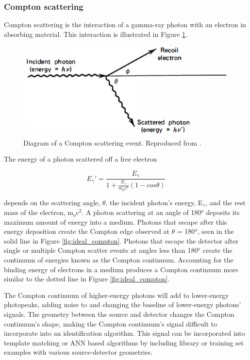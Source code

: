 \subsubsection{Compton scattering}

Compton scattering is the interaction of a gamma-ray photon with an electron in absorbing material. This interaction is illustrated in Figure \ref{fig:compton_scatter}.



\begin{figure}[H]
\centering
\includegraphics[width=0.7\linewidth]{images/compton_scatter}
\caption{Diagram of a Compton scattering event. Reproduced from \cite{knoll}.}
\label{fig:compton_scatter}
\end{figure}

The energy of a photon scattered off a free electron

\begin{equation} \label{eq:compton_scatter}
E_{\gamma}' = \frac{E_{\gamma}}{1 + \frac{E_{\gamma}}{m_{0} c^2} (1-cos\theta)}
\end{equation}

depends on the scattering angle, $\theta$, the incident photon's energy, E$_{\gamma}$, and the rest mass of the electron, m$_{o}$c$^{2}$. A photon scattering at an angle of 180$^{o}$ deposits its maximum amount of energy into a medium. Photons that escape after this energy deposition create the Compton edge observed at $\theta$ = 180$^{o}$, seen in the solid line in Figure \ref{fig:ideal_compton}. Photons that escape the detector after single or multiple Compton scatter events at angles less than 180$^{o}$ create the continuum of energies known as the Compton continuum. Accounting for the binding energy of electrons in a medium produces a Compton continuum more similar to the dotted line in Figure \ref{fig:ideal_compton}.

The Compton continuum of higher-energy photons will add to lower-energy photopeaks, adding noise to and changing the baseline of lower-energy photons' signals. The geometry between the source and detector changes the Compton continuum's shape, making the Compton continuum's signal difficult to incorporate into an identification algorithm. This signal can be incorporated into template matching or ANN based algorithms by including library or training set examples with various source-detector geometries.

